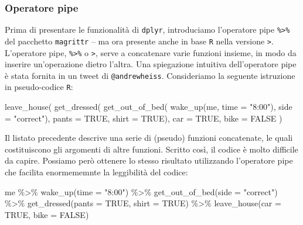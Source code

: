 \documentclass[
  10pt,
  italian,
  a4paper,
  extrafontsizes,onecolumn,openright
  ]{memoir}
\newenvironment{Shaded}{\begin{snugshade}}{\end{snugshade}}
\newcommand{\AttributeTok}[1]{\textcolor[rgb]{0.77,0.63,0.00}{#1}}
\newcommand{\ConstantTok}[1]{\textcolor[rgb]{0.00,0.00,0.00}{#1}}
\newcommand{\FunctionTok}[1]{\textcolor[rgb]{0.00,0.00,0.00}{#1}}
\newcommand{\NormalTok}[1]{#1}
\newcommand{\SpecialCharTok}[1]{\textcolor[rgb]{0.00,0.00,0.00}{#1}}
\newcommand{\StringTok}[1]{\textcolor[rgb]{0.31,0.60,0.02}{#1}}
\begin{document}
\hypertarget{operatore-pipe}{%
\subsubsection{Operatore pipe}\label{operatore-pipe}}

Prima di presentare le funzionalità di \texttt{dplyr}, introduciamo l'operatore pipe \texttt{\%\textgreater{}\%} del pacchetto \texttt{magrittr} -- ma ora presente anche in base \texttt{R} nella versione \texttt{\textbar{}\textgreater{}}. L'operatore pipe, \texttt{\%\textgreater{}\%} o \texttt{\textbar{}\textgreater{}}, serve a concatenare varie funzioni insieme, in modo da inserire un'operazione dietro l'altra. Una spiegazione intuitiva dell'operatore pipe è stata fornita in un tweet di \texttt{@andrewheiss}. Consideriamo la seguente istruzione in pseudo-codice \texttt{R}:

\begin{Shaded}
\begin{Highlighting}[]
\FunctionTok{leave\_house}\NormalTok{(}
  \FunctionTok{get\_dressed}\NormalTok{(}
    \FunctionTok{get\_out\_of\_bed}\NormalTok{(}
      \FunctionTok{wake\_up}\NormalTok{(me, }\AttributeTok{time =} \StringTok{"8:00"}\NormalTok{), }
      \AttributeTok{side =} \StringTok{"correct"}\NormalTok{), }
    \AttributeTok{pants =} \ConstantTok{TRUE}\NormalTok{, }
    \AttributeTok{shirt =} \ConstantTok{TRUE}\NormalTok{), }
  \AttributeTok{car =} \ConstantTok{TRUE}\NormalTok{, }
  \AttributeTok{bike =} \ConstantTok{FALSE}
\NormalTok{)}
\end{Highlighting}
\end{Shaded}

Il listato precedente descrive una serie di (pseudo) funzioni concatenate, le quali costituiscono gli argomenti di altre funzioni. Scritto così, il codice è molto difficile da capire. Possiamo però ottenere lo stesso risultato utilizzando l'operatore pipe che facilita enormememnte la leggibilità del codice:

\begin{Shaded}
\begin{Highlighting}[]
\NormalTok{me }\SpecialCharTok{\%\textgreater{}\%} 
  \FunctionTok{wake\_up}\NormalTok{(}\AttributeTok{time =} \StringTok{"8:00"}\NormalTok{) }\SpecialCharTok{\%\textgreater{}\%} 
  \FunctionTok{get\_out\_of\_bed}\NormalTok{(}\AttributeTok{side =} \StringTok{"correct"}\NormalTok{) }\SpecialCharTok{\%\textgreater{}\%} 
  \FunctionTok{get\_dressed}\NormalTok{(}\AttributeTok{pants =} \ConstantTok{TRUE}\NormalTok{, }\AttributeTok{shirt =} \ConstantTok{TRUE}\NormalTok{) }\SpecialCharTok{\%\textgreater{}\%} 
  \FunctionTok{leave\_house}\NormalTok{(}\AttributeTok{car =} \ConstantTok{TRUE}\NormalTok{, }\AttributeTok{bike =} \ConstantTok{FALSE}\NormalTok{)}
\end{Highlighting}
\end{Shaded}
\end{document}
